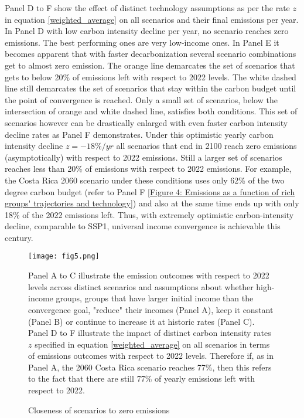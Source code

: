 \documentclass{article}
\begin{document}
Panel D to F show the effect of distinct technology assumptions as per the rate \(z\) in equation \ref{weighted_average} on all scenarios and their final emissions per year. In Panel D with low carbon intensity decline per year, no scenario reaches zero emissions. The best performing ones are very low-income ones. In Panel E it becomes apparent that with faster decarbonization several scenario combinations get to almost zero emission. The orange line demarcates the set of scenarios that gets to below 20\% of emissions left with respect to 2022 levels. The white dashed line still demarcates the set of scenarios that stay within the carbon budget until the point of convergence is reached. Only a small set of scenarios, below the intersection of orange and white dashed line, satisfies both conditions. This set of scenarios however can be drastically enlarged with even faster carbon intensity decline rates as Panel F demonstrates. Under this optimistic yearly carbon intensity decline \(z = -18\%/yr\) all scenarios that end in 2100 reach zero emissions (asymptotically) with respect to 2022 emissions. Still a larger set of scenarios reaches less than 20\% of emissions with respect to 2022 emissions. For example, the Costa Rica 2060 scenario under these conditions uses only 62\% of the two degree carbon budget (refer to Panel F \ref{Figure 4: Emissions as a function of rich groups' trajectories and technology}) and also at the same time ends up with only 18\% of the 2022 emissions left. Thus, with extremely optimistic carbon-intensity decline, comparable to SSP1, universal income convergence is achievable this century.

\begin{figure}[hbt!]
\centering
 \texttt{[image: fig5.png]}
  \caption{Closeness of scenarios to zero emissions}
  \label{Figure 5: Emissions as a function of rich groups' trajectories}
  \medskip
\small Panel A to C illustrate the emission outcomes with respect to 2022 levels across distinct scenarios and assumptions about whether high-income groups, groups that have larger initial income than the convergence goal, "reduce" their incomes (Panel A), keep it constant (Panel B) or continue to increase it at historic rates (Panel C). Panel D to F illustrate the impact  of distinct carbon intensity rates \(z\) specified in equation \ref{weighted_average} on all scenarios in terms of emissions outcomes with respect to 2022 levels. Therefore if, as in Panel A, the 2060 Costa Rica scenario reaches 77\%, then this refers to the fact that there are still 77\% of yearly emissions left with respect to 2022.
\end{figure}
\end{document}
